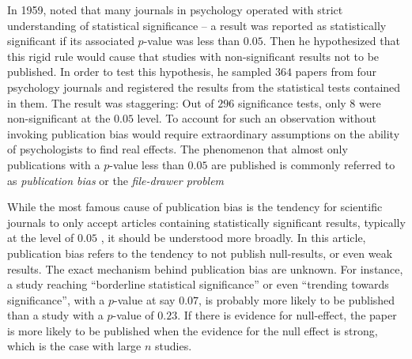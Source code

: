 In 1959, \citeauthor{Sterling1959-cq} noted that many journals
in psychology operated with strict understanding of statistical significance
-- a result was reported as statistically significant if its associated
$p$-value was less than $0.05$. Then he hypothesized that this rigid
rule would cause that studies with non-significant results not to
be published. In order to test this hypothesis, he sampled $364$
papers from four psychology journals and registered the results from
the statistical tests contained in them. The result was staggering:
Out of $296$ significance tests, only $8$ were non-significant at
the $0.05$ level. To account for such an observation without invoking
publication bias would require extraordinary assumptions on the ability
of psychologists to find real effects. The phenomenon that almost
only publications with a $p$-value less than $0.05$ are published
is commonly referred to as \emph{publication bias} or the \emph{file-drawer
problem \parencite{rosenthal_file_1979}}

While the most famous cause of publication bias is the tendency for
scientific journals to only accept articles containing statistically
significant results, typically at the level of $0.05$ \parencite{simmons_false-positive_2011},
it should be understood more broadly. In this article, publication
bias refers to the tendency to not publish null-results, or even weak
results. The exact mechanism behind publication bias are unknown.
For instance, a study reaching ``borderline statistical significance''
or even ``trending towards significance'', with a $p$-value at
say $0.07$, is probably more likely to be published than a study
with a $p$-value of $0.23$. If there is evidence for null-effect,
the paper is more likely to be published when the evidence for the
null effect is strong, which is the case with large $n$ studies. 

